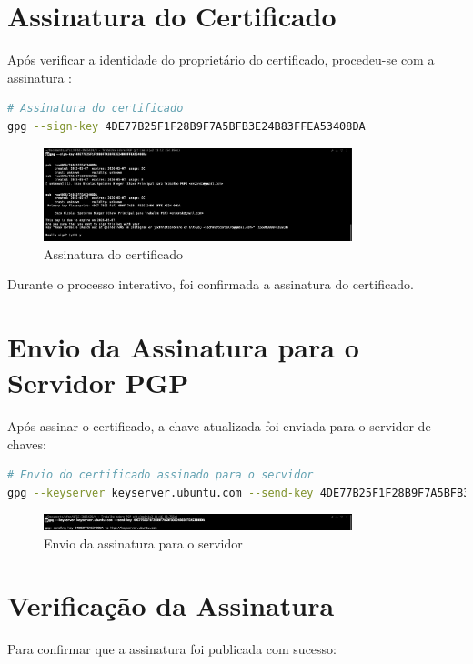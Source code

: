 \section{Assinatura do Certificado}
Após verificar a identidade do proprietário do certificado, procedeu-se com a assinatura \cite{gnupgkeysigning}:

\begin{lstlisting}[language=bash]
# Assinatura do certificado
gpg --sign-key 4DE77B25F1F28B9F7A5BFB3E24B83FFEA53408DA
\end{lstlisting}

\begin{figure}[htb]
    \centering
    \includegraphics[width=0.8\textwidth]{images/03-assinatura_certificado.jpg}
    \caption{Assinatura do certificado}
    \label{fig:assinatura-certificado}
\end{figure}

Durante o processo interativo, foi confirmada a assinatura do certificado.

\section{Envio da Assinatura para o Servidor PGP}
Após assinar o certificado, a chave atualizada foi enviada para o servidor de chaves:

\begin{lstlisting}[language=bash]
# Envio do certificado assinado para o servidor
gpg --keyserver keyserver.ubuntu.com --send-key 4DE77B25F1F28B9F7A5BFB3E24B83FFEA53408DA
\end{lstlisting}

\begin{figure}[htb]
    \centering
    \includegraphics[width=0.8\textwidth]{images/03-envio_assinatura_servidor.jpg}
    \caption{Envio da assinatura para o servidor}
    \label{fig:envio-assinatura-servidor}
\end{figure}

\section{Verificação da Assinatura}
Para confirmar que a assinatura foi publicada com sucesso:

